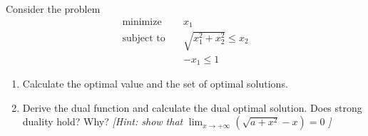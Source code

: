 \documentclass[11pt,letter,notitlepage]{article}
\theoremstyle{definition}
\begin{document}
\newpage

\begin{exercise}
Consider the problem
\[
\begin{aligned}
    \text{minimize} \quad & x_1 \\
    \text{subject to} \quad & \sqrt{x_1^2 + x_2^2} \le x_2 \\
    & -x_1 \le 1
\end{aligned}
\]

\begin{enumerate}
    \item[(a)] Calculate the optimal value and the set of optimal solutions.
    \item[(b)] Derive the dual function and calculate the dual optimal solution. Does strong duality hold? Why?
    \textit{[Hint: show that } $\lim_{x\to +\infty} \left(\sqrt{a+x^2}-x\right)=0$ \textit{]}
\end{enumerate}
\end{exercise}

\newpage
\end{document}
